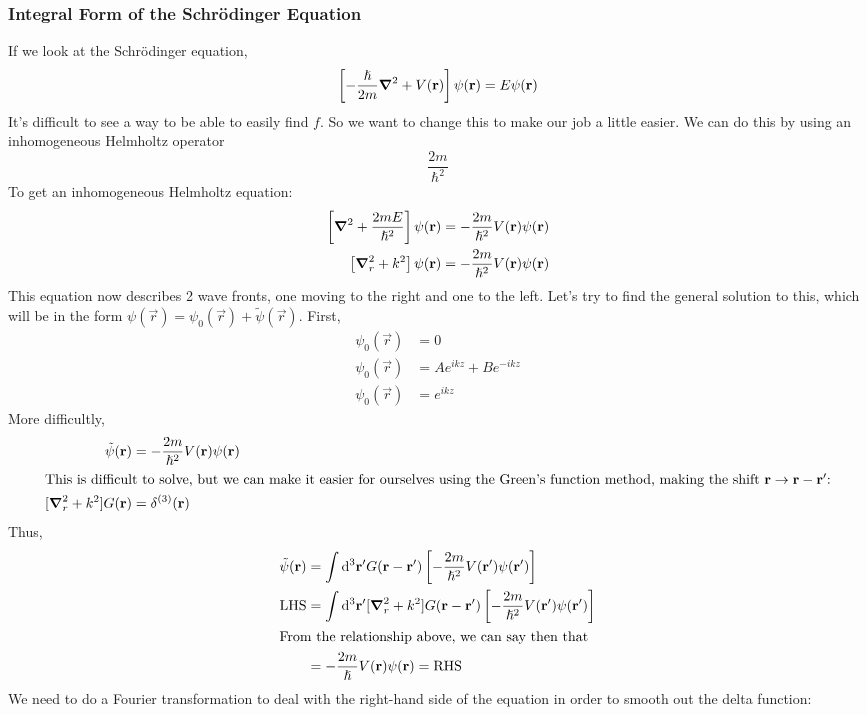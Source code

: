 \documentclass[a4paper]{article}
\begin{document}
\subsubsection{Integral Form of the Schr\"odinger Equation}
If we look at the Schr\"odinger equation,
\[
	\left[-\frac{\hslash}{2m}\boldsymbol{\mathbf{\nabla}}^2+V(\boldsymbol{\mathbf{r}})\right]\psi(\boldsymbol{\mathbf{r}}) =
	E\psi(\boldsymbol{\mathbf{r}})
\]
It's difficult to see a way to be able to easily find $f$. So we want to change
this to make our job a little easier. We can do this by using an inhomogeneous
Helmholtz operator
\[
	\frac{2m}{\hslash^2}
\]
To get an inhomogeneous Helmholtz equation:
\begin{align*}
	\left[\boldsymbol{\mathbf{\nabla}}^2+\frac{2mE}{\hslash^2}\right]\psi(\boldsymbol{\mathbf{r}}) &=
	-\frac{2m}{\hslash^2}V(\boldsymbol{\mathbf{r}})\psi(\boldsymbol{\mathbf{r}})\\
	\left[\boldsymbol{\mathbf{\nabla}}_{r}^2+k^2\right]\psi(\boldsymbol{\mathbf{r}}) &=
	-\frac{2m}{\hslash^2}V(\boldsymbol{\mathbf{r}})\psi(\boldsymbol{\mathbf{r}})
\end{align*}
This equation now describes 2 wave fronts, one moving to the right and one to
the left. Let's try to find the general solution to this, which will be in the
form $\psi(\vec{r}) = \psi_0(\vec{r}) + \tilde{\psi}(\vec{r})$. First, 
\begin{align*}
	[\del_r^2+k^2]\psi_0(\vec{r}) &= 0\\
	\psi_0(\vec{r}) &= Ae^{ikz} + Be^{-ikz}\\
	\psi_0(\vec{r}) &= e^{ikz}
\end{align*}
More difficultly,
\begin{align*}
	[\del_r^2+k^2]\tilde{\psi}(\vec{r}) &=
	-\frac{2m}{\hslash^2}V(\vec{r})\psi(\vec{r})\\
\intertext{This is difficult to solve, but we can make it easier for ourselves
using the Green's function method, making the shift \(\vec{r} \to
	\vec{r}-\vec{r}'\):}
	[\del_r^2+k^2]G(\vec{r}) &= \delta^{(3)}(\vec{r})
\end{align*}
Thus,
\begin{align*}
\tilde{\psi}(\boldsymbol{\mathbf{r}}) &= \int \mathrm{d}^3\boldsymbol{\mathbf{r}}'G(\boldsymbol{\mathbf{r}}-\boldsymbol{\mathbf{r}}')\left[
	-\frac{2m}{\hslash^2}V(\boldsymbol{\mathbf{r}}')\psi(\boldsymbol{\mathbf{r}}')\right]\\
	\text{LHS} &= \int \mathrm{d}^3\boldsymbol{\mathbf{r}}'[\boldsymbol{\mathbf{\nabla}}_r^2+k^2]G(\boldsymbol{\mathbf{r}}-\boldsymbol{\mathbf{r}}')\left[
	-\frac{2m}{\hslash^2}V(\boldsymbol{\mathbf{r}}')\psi(\boldsymbol{\mathbf{r}}')\right]\\
\intertext{From the relationship above, we can say then that}
	&= -\frac{2m}{\hslash}V(\boldsymbol{\mathbf{r}})\psi(\boldsymbol{\mathbf{r}}) = \text{RHS}
\end{align*}
We need to do a Fourier transformation to deal with the right-hand side of the
equation in order to smooth out the delta function:
\end{document}
